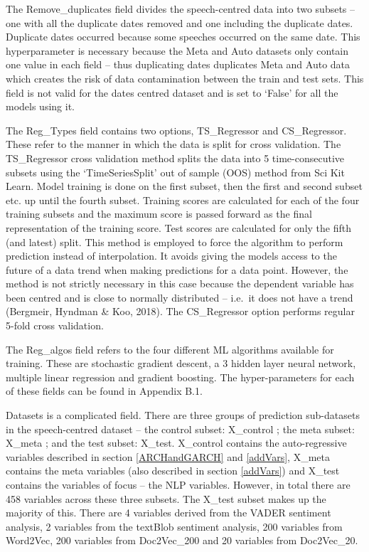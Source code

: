 \documentclass[11pt,preprint, authoryear]{elsarticle}
\numberwithin{equation}{section}
\numberwithin{figure}{section}
\numberwithin{table}{section}
\begin{document}
The Remove\_duplicates field divides the speech-centred data into two
subsets -- one with all the duplicate dates removed and one including
the duplicate dates. Duplicate dates occurred because some speeches
occurred on the same date. This hyperparameter is necessary because the
Meta and Auto datasets only contain one value in each field -- thus
duplicating dates duplicates Meta and Auto data which creates the risk
of data contamination between the train and test sets. This field is not
valid for the dates centred dataset and is set to `False' for all the
models using it.

The Reg\_Types field contains two options, TS\_Regressor and
CS\_Regressor. These refer to the manner in which the data is split for
cross validation. The TS\_Regressor cross validation method splits the
data into 5 time-consecutive subsets using the `TimeSeriesSplit' out of
sample (OOS) method from Sci Kit Learn. Model training is done on the
first subset, then the first and second subset etc. up until the fourth
subset. Training scores are calculated for each of the four training
subsets and the maximum score is passed forward as the final
representation of the training score. Test scores are calculated for
only the fifth (and latest) split. This method is employed to force the
algorithm to perform prediction instead of interpolation. It avoids
giving the models access to the future of a data trend when making
predictions for a data point. However, the method is not strictly
necessary in this case because the dependent variable has been centred
and is close to normally distributed -- i.e.~it does not have a trend
(Bergmeir, Hyndman \& Koo, 2018). The CS\_Regressor option performs
regular 5-fold cross validation.

The Reg\_algos field refers to the four different ML algorithms
available for training. These are stochastic gradient descent, a 3
hidden layer neural network, multiple linear regression and gradient
boosting. The hyper-parameters for each of these fields can be found in
Appendix B.1.

Datasets is a complicated field. There are three groups of prediction
sub-datasets in the speech-centred dataset -- the control subset:
X\_control ; the meta subset: X\_meta ; and the test subset: X\_test.
X\_control contains the auto-regressive variables described in section
\ref{ARCHandGARCH} and \ref{addVars}, X\_meta contains the meta
variables (also described in section \ref{addVars}) and X\_test contains
the variables of focus -- the NLP variables. However, in total there are
458 variables across these three subsets. The X\_test subset makes up
the majority of this. There are 4 variables derived from the VADER
sentiment analysis, 2 variables from the textBlob sentiment analysis,
200 variables from Word2Vec, 200 variables from Doc2Vec\_200 and 20
variables from Doc2Vec\_20.
\end{document}
